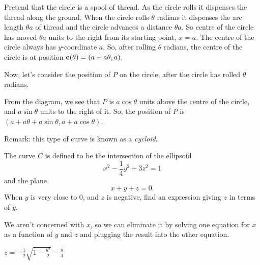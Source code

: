 \begin{solution}
Pretend that the circle is a spool of thread. As the 
           circle rolls it dispenses the thread along the ground.
           When the circle rolls $\theta$ radians it dispenses the
           arc length $\theta a$ of thread and the circle advances
           a distance $\theta a$. So centre of the circle has 
           moved $\theta a$ units to the right from its starting point, $x=a$. The centre of the circle always has $y$-coordinate $a$. So, after rolling $\theta$ radians, the centre of the circle is at position $\mathbf{c}(\theta)=(a+a\theta,a)$.

Now, let's consider the position of $P$ on the circle, after the circle has rolled $\theta$ radians. 

\begin{center}
\end{center}
From the diagram, we see that $P$ is $a\cos \theta$ units above the centre of the circle, and $a\sin \theta$ units to the right of it. So, the position of $P$ is $(a+a\theta+a\sin\theta,a+a\cos\theta)$.

Remark: this type of curve is known as a \emph{cycloid}.
\end{solution}
\begin{question}\label{prob_s1.0last}
The curve $C$ is defined to be the intersection of the ellipsoid
\[x^2-\frac{1}{4}y^2+3z^2=1\]
and the plane
\[x+y+z=0.\]
When $y$ is very close to 0, and $z$ is negative, find an expression giving $z$ in terms of $y$.
\end{question}
\begin{hint}
We aren't concerned with $x$, so we can eliminate it by solving one equation for $x$ as a function
        of $y$ and $z$ and plugging the result into the other equation.
        \end{hint}
\begin{answer}
$z=-\frac12\sqrt{1-\frac{y^2}{2}}-\frac{y}{4}$
\end{answer}
